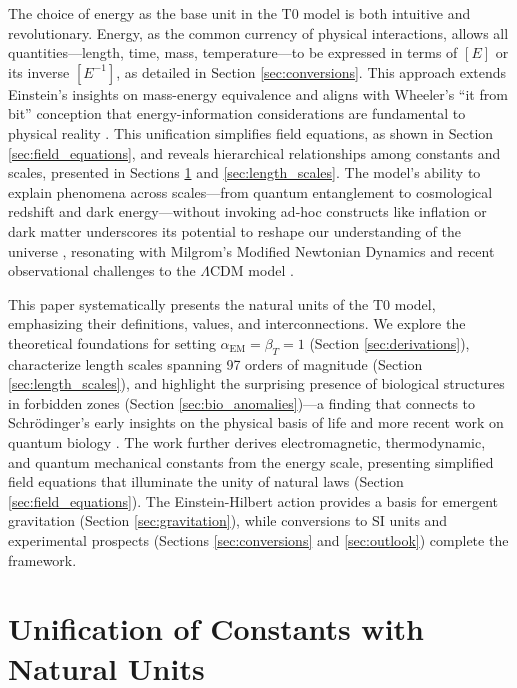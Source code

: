 \documentclass[twocolumn,aps,prl]{revtex4-2}
\begin{document}
	The choice of energy as the base unit in the T0 model is both intuitive and revolutionary. Energy, as the common currency of physical interactions, allows all quantities—length, time, mass, temperature—to be expressed in terms of $[E]$ or its inverse $[E^{-1}]$, as detailed in Section \ref{sec:conversions}. This approach extends Einstein’s insights on mass-energy equivalence \cite{Einstein1905b} and aligns with Wheeler’s “it from bit” conception that energy-information considerations are fundamental to physical reality \cite{Wheeler1990}. This unification simplifies field equations, as shown in Section \ref{sec:field_equations}, and reveals hierarchical relationships among constants and scales, presented in Sections \ref{sec:hierarchy} and \ref{sec:length_scales}. The model’s ability to explain phenomena across scales—from quantum entanglement to cosmological redshift and dark energy—without invoking ad-hoc constructs like inflation \cite{Guth1981} or dark matter \cite{Rubin1980} underscores its potential to reshape our understanding of the universe \cite{pascher_energiedynamik_2025}, resonating with Milgrom’s Modified Newtonian Dynamics \cite{Milgrom1983} and recent observational challenges to the $\Lambda\text{CDM}$ model \cite{Riess2016}.
	
	This paper systematically presents the natural units of the T0 model, emphasizing their definitions, values, and interconnections. We explore the theoretical foundations for setting $\alpha_{\text{EM}} = \beta_T = 1$ (Section \ref{sec:derivations}), characterize length scales spanning 97 orders of magnitude (Section \ref{sec:length_scales}), and highlight the surprising presence of biological structures in forbidden zones (Section \ref{sec:bio_anomalies})—a finding that connects to Schrödinger’s early insights on the physical basis of life \cite{Schrodinger1944} and more recent work on quantum biology \cite{McFadden2014}. The work further derives electromagnetic, thermodynamic, and quantum mechanical constants from the energy scale, presenting simplified field equations that illuminate the unity of natural laws (Section \ref{sec:field_equations}). The Einstein-Hilbert action provides a basis for emergent gravitation (Section \ref{sec:gravitation}), while conversions to SI units and experimental prospects (Sections \ref{sec:conversions} and \ref{sec:outlook}) complete the framework.
	
	\section{Unification of Constants with Natural Units}
	\label{sec:hierarchy}
	
\end{document}
